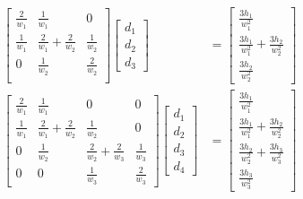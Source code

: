 \documentclass{article}
\begin{document}
\begin{align*}
  \begin{bmatrix}
    \frac{2}{w_1} & \frac{1}{w_1} & 0 \\
    \frac{1}{w_1} & \frac{2}{w_1}+\frac{2}{w_2} & \frac{1}{w_2} \\
    0 & \frac{1}{w_2} & \frac{2}{w_2} \\
  \end{bmatrix}
  \begin{bmatrix}
    d_1 \\ d_2 \\ d_3
  \end{bmatrix}
  &=
  \begin{bmatrix}
    \frac{3h_1}{w_1^2} \\
    \frac{3h_1}{w_1^2}+\frac{3h_2}{w_2^2} \\
    \frac{3h_2}{w_2^2}
  \end{bmatrix} \\
  \begin{bmatrix}
    \frac{2}{w_1} & \frac{1}{w_1} & 0 & 0 \\
    \frac{1}{w_1} & \frac{2}{w_1}+\frac{2}{w_2} & \frac{1}{w_2} & 0 \\
    0 & \frac{1}{w_2} & \frac{2}{w_2}+\frac{2}{w_3} & \frac{1}{w_3} \\
    0 & 0 & \frac{1}{w_3} & \frac{2}{w_3}
  \end{bmatrix}
  \begin{bmatrix}
    d_1 \\ d_2 \\ d_3 \\ d_4
  \end{bmatrix}
  &=
  \begin{bmatrix}
    \frac{3h_1}{w_1^2} \\
    \frac{3h_1}{w_1^2}+\frac{3h_2}{w_2^2} \\
    \frac{3h_2}{w_2^2}+\frac{3h_3}{w_3^2} \\
    \frac{3h_3}{w_3^2}
  \end{bmatrix}
\end{align*}
\end{document}
